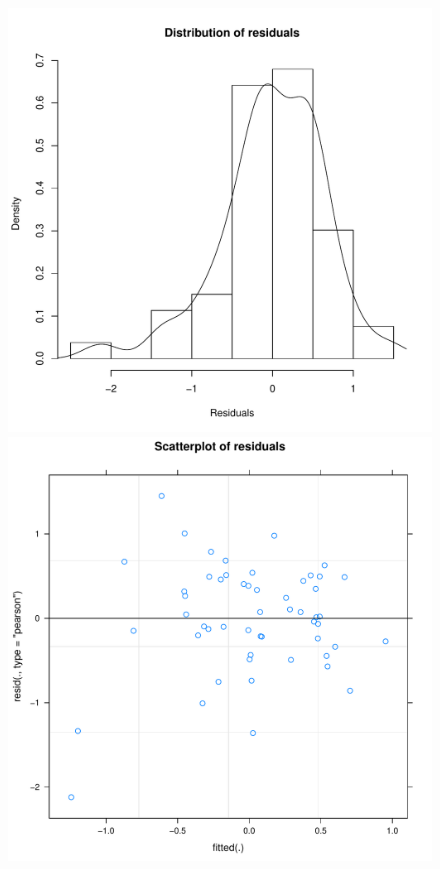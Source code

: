 \begin{CJK}{UTF8}{gbsn}
\begin{figure}[htbp]
    \includegraphics[scale =.4]{images/TEM3Hist.pdf}
    \includegraphics[scale =.4]{images/TEM3Scatter.pdf}

\end{figure}
\end{CJK}
